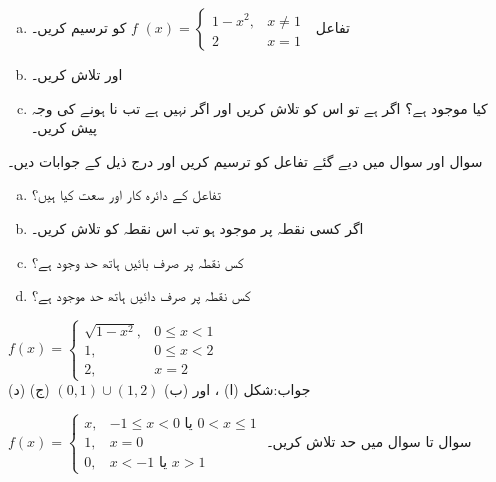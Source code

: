 \begin{enumerate}[a.]
\item
تفاعل
$f\,\,(x)=\begin{cases} 1-x^2,&x\ne 1\\ 2&x=1 \,\,\end{cases}$
کو ترسیم کریں۔
\item
{} اور  تلاش کریں۔
\item
کیا  موجود ہے؟ اگر ہے تو اس کو تلاش کریں اور اگر نہیں ہے تب نا ہونے کی وجہ پیش کریں۔
\end{enumerate}
سوال  اور سوال  میں دیے گئے تفاعل کو ترسیم کریں اور درج ذیل کے جوابات دیں۔
\begin{enumerate}[a.]
\item
تفاعل  کے دائرہ کار اور سعت کیا ہیں؟
\item
اگر کسی نقطہ  پر  موجود ہو تب اس نقطہ کو تلاش کریں۔
\item
کس نقطہ پر صرف بائیں ہاتھ حد وجود ہے؟
\item
کس نقطہ پر صرف دائیں ہاتھ حد موجود ہے؟
\end{enumerate}

$f(x)=\begin{cases}\sqrt{1-x^2},&0\le x<1\\ 1,&0\le x<2\\ 2,&x=2  \end{cases}$\\
جواب:\quad شکل \quad 
(ا) ،  اور  (ب) 
$(0,1)\cup (1,2)$
(ج)  (د)  

$f(x)=\begin{cases}x,&-1\le x<0\,\, \text{یا}\,\, 0<x\le 1\\ 1,& x=0\\ 0,&x<-1 \,\,\text{یا}\,\, x>1  \end{cases}$
 سوال  تا سوال  میں حد تلاش کریں۔

